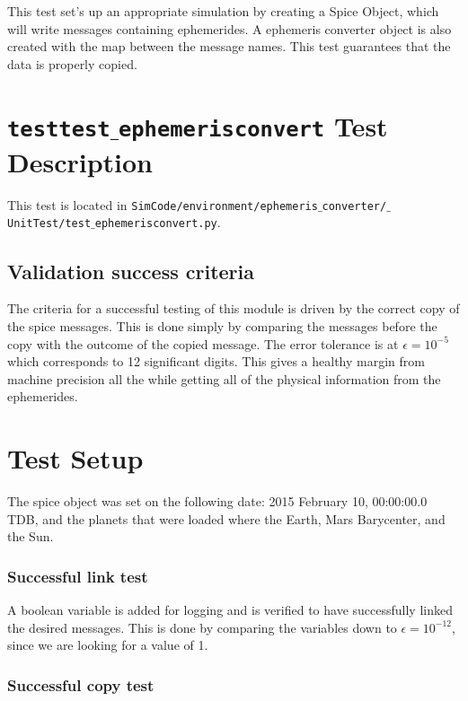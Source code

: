 \documentclass[]{BasiliskReportMemo}
\begin{document}
This test set's up an appropriate simulation by creating a Spice Object, which will write messages containing ephemerides. A ephemeris converter object is also created with the map between the message names. This test guarantees that the data is properly copied.


\section{{\tt test\textunderscore test$\_$ephemerisconvert} Test Description}

This test is located in {\tt SimCode/environment/ephemeris$\_$converter/$\_$UnitTest/test$\_$ephemerisconvert.py}. \par

\subsection{Validation success criteria }

The criteria for a successful testing of this module is driven by the correct copy of the spice messages. This is done simply by comparing the messages before the copy with the outcome of the copied message. The error tolerance is at $\epsilon =10^{-5}$ which corresponds to 12 significant digits. This gives a healthy margin from machine precision all the while getting all of the physical information from the ephemerides. 

\section{Test Setup}

The spice object was set on the following date: 2015 February 10, 00:00:00.0 TDB, and the planets that were loaded where the Earth, Mars Barycenter, and the Sun.

\subsubsection*{Successful link test}

A boolean variable is added for logging and is verified to have successfully linked the desired messages. This is done by comparing the variables down to $\epsilon =10^{-12}$, since we are looking for a value of 1.

\subsubsection*{Successful copy test}
\end{document}
